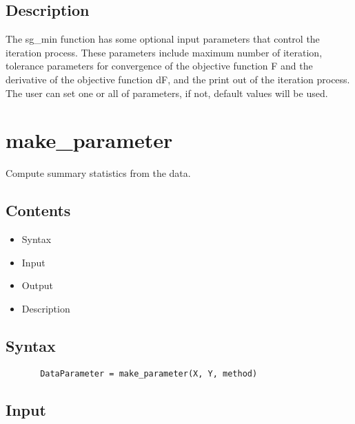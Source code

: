 \documentclass[a4paper,11pt,openany]{memoir}
\begin{document}
\subsection*{Description}

\begin{par}
The sg\_min function has some optional input parameters that control the iteration process.  These parameters include maximum number of iteration, tolerance parameters for convergence of the objective function F and the derivative of the objective function dF, and the print out of the iteration process.  The user can set one or all of parameters, if not, default values will be used.
\end{par} \vspace{1em}

\newpage

\rmfamily
\color{black}\section{make\_parameter}

\begin{par}
Compute summary statistics from the data.
\end{par} \vspace{1em}

\subsection*{Contents}

\begin{itemize}
\setlength{\itemsep}{-1ex}
   \item Syntax
   \item Input
   \item Output
   \item Description
\end{itemize}


\subsection*{Syntax}


\begin{verbatim}       DataParameter = make_parameter(X, Y, method)\end{verbatim}
    

\subsection*{Input}
\end{document}
